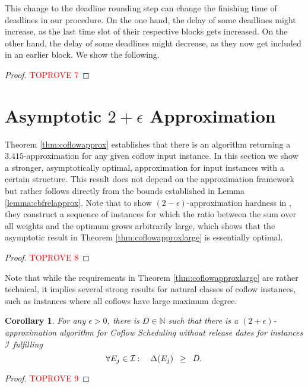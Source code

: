 \documentclass[11pt]{article}
\newcommand{\Hquad}{\hspace{0.5em}}
\newtheorem{corollary}[theorem]{Corollary}
\begin{document}
This change to the deadline rounding step can change the finishing time of deadlines in our procedure. On the one hand, the delay of some deadlines might increase, as the last time slot of their respective blocks gets increased. On the other hand, the delay of some deadlines might decrease, as they now get included in an earlier block. We show the following.

\rsthmcbf*
\begin{proof}\textcolor{red}{TOPROVE 7}\end{proof}

\section{Asymptotic $2+\epsilon$ Approximation}\label{sec:asymp}
Theorem \ref{thm:coflowapprox} establishes that there is an algorithm returning a $3.415$-approximation for any given coflow input instance. In this section we show a stronger, asymptotically optimal, approximation for input instances with a certain structure. This result does not depend on the approximation framework but rather follows directly from the bounds established in Lemma \ref{lemma:cbfrelapprox}. Note that to show $(2-\epsilon)$-approximation hardness in \cite{Sachdeva2013}, they construct a sequence of instances for which the ratio between the sum over all weights and the optimum grows arbitrarily large, which shows that the asymptotic result in Theorem \ref{thm:coflowapproxlarge} is essentially optimal.

\rsthmcoflowapproxlarge*

\begin{proof}\textcolor{red}{TOPROVE 8}\end{proof}

Note that while the requirements in Theorem \ref{thm:coflowapproxlarge} are rather technical, it implies several strong results for natural classes of coflow instances, such as instances where all coflows have large maximum degree.

\begin{corollary}
For any $\epsilon > 0$, there is $D \in \mathbb{N}$ such that there is a $(2+\epsilon)$-approximation algorithm for Coflow Scheduling without release dates for instances $\mathcal{I}$ fulfilling
\begin{equation*}
    \forall E_j \in \mathcal{I}:\quad \Delta(E_j) \Hquad\ge\Hquad D.
\end{equation*}
\end{corollary}
\begin{proof}\textcolor{red}{TOPROVE 9}\end{proof}
\end{document}
